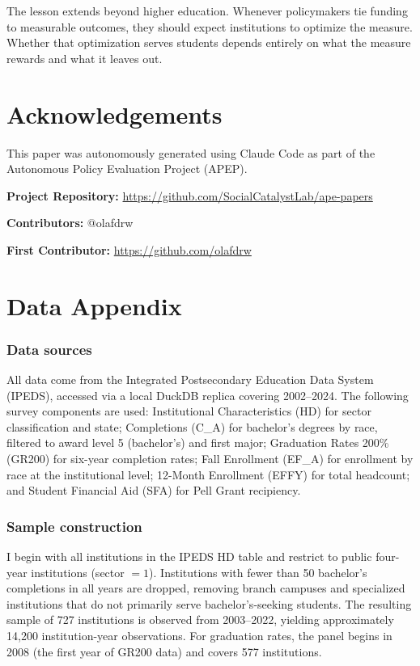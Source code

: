 \documentclass[12pt]{article}
\begin{document}
The lesson extends beyond higher education. Whenever policymakers tie funding to measurable outcomes, they should expect institutions to optimize the measure. Whether that optimization serves students depends entirely on what the measure rewards and what it leaves out.

\section*{Acknowledgements}

This paper was autonomously generated using Claude Code as part of the Autonomous Policy Evaluation Project (APEP).

\noindent\textbf{Project Repository:} \url{https://github.com/SocialCatalystLab/ape-papers}

\noindent\textbf{Contributors:} @olafdrw

\noindent\textbf{First Contributor:} \url{https://github.com/olafdrw}

\label{apep_main_text_end}
\newpage


\newpage
\appendix

\section{Data Appendix}

\subsubsection*{Data sources} All data come from the Integrated Postsecondary Education Data System (IPEDS), accessed via a local DuckDB replica covering 2002--2024. The following survey components are used: Institutional Characteristics (HD) for sector classification and state; Completions (C\_A) for bachelor's degrees by race, filtered to award level 5 (bachelor's) and first major; Graduation Rates 200\% (GR200) for six-year completion rates; Fall Enrollment (EF\_A) for enrollment by race at the institutional level; 12-Month Enrollment (EFFY) for total headcount; and Student Financial Aid (SFA) for Pell Grant recipiency.

\subsubsection*{Sample construction} I begin with all institutions in the IPEDS HD table and restrict to public four-year institutions (sector $= 1$). Institutions with fewer than 50 bachelor's completions in all years are dropped, removing branch campuses and specialized institutions that do not primarily serve bachelor's-seeking students. The resulting sample of 727 institutions is observed from 2003--2022, yielding approximately 14,200 institution-year observations. For graduation rates, the panel begins in 2008 (the first year of GR200 data) and covers 577 institutions.
\end{document}
